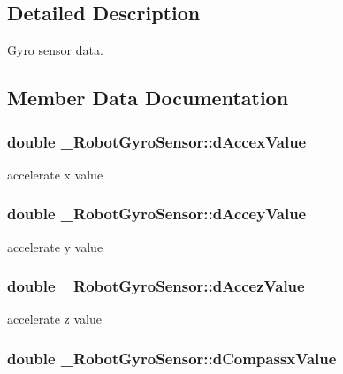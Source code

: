 \subsection{Detailed Description}
Gyro sensor data. 

\subsection{Member Data Documentation}
\hypertarget{struct__RobotGyroSensor_a97eb6256affeaa07f5ab6f395d5c1920}{
\subsubsection[{d\-Accex\-Value}]{\setlength{\rightskip}{0pt plus 5cm}double \-\_\-\-Robot\-Gyro\-Sensor\-::d\-Accex\-Value}}\label{struct__RobotGyroSensor_a97eb6256affeaa07f5ab6f395d5c1920}
accelerate x value \hypertarget{struct__RobotGyroSensor_a1a4ef02d86889de34db54eac401ad877}{
\subsubsection[{d\-Accey\-Value}]{\setlength{\rightskip}{0pt plus 5cm}double \-\_\-\-Robot\-Gyro\-Sensor\-::d\-Accey\-Value}}\label{struct__RobotGyroSensor_a1a4ef02d86889de34db54eac401ad877}
accelerate y value \hypertarget{struct__RobotGyroSensor_a85a5d81f93840612f5cf45bef4281f8e}{
\subsubsection[{d\-Accez\-Value}]{\setlength{\rightskip}{0pt plus 5cm}double \-\_\-\-Robot\-Gyro\-Sensor\-::d\-Accez\-Value}}\label{struct__RobotGyroSensor_a85a5d81f93840612f5cf45bef4281f8e}
accelerate z value \hypertarget{struct__RobotGyroSensor_aa6563418e0328d8ced1004a74ec4f4c1}{
\subsubsection[{d\-Compassx\-Value}]{\setlength{\rightskip}{0pt plus 5cm}double \-\_\-\-Robot\-Gyro\-Sensor\-::d\-Compassx\-Value}}\label{struct__RobotGyroSensor_aa6563418e0328d8ced1004a74ec4f4c1}
